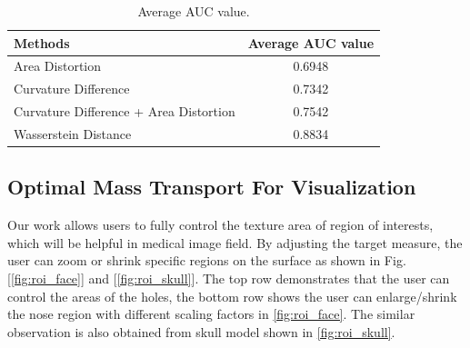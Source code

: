\documentclass[runningheads]{llncs}
\begin{document}
\begin{table}
\centering
\caption{Average AUC value.}
\label{tbl:ROC}
\begin{tabular}[\textwidth]{@{\extracolsep{\fill}}lc}
\hline
Methods & Average AUC value\\
\hline
Area Distortion& 0.6948 \\
Curvature Difference & 0.7342\\
Curvature Difference + Area Distortion & 0.7542\\
Wasserstein Distance & 0.8834\\
\hline
\end{tabular}
\end{table}





\subsection{Optimal Mass Transport For Visualization}
Our work\cite{su2016area} allows users to fully control the texture area of region of interests, which will be helpful in medical image field. By adjusting the target measure, the user can zoom or shrink specific regions on the surface as shown in Fig. [\ref{fig:roi_face}] and [\ref{fig:roi_skull}].
The top row demonstrates that the user can control the areas of the holes, the bottom row shows the user can enlarge/shrink the nose region with different scaling factors in \ref{fig:roi_face}. The similar observation is also obtained from skull model shown in \ref{fig:roi_skull}.
\end{document}

